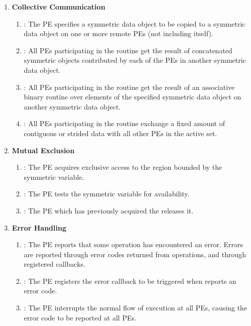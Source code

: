 \begin{enumerate}
\item \textbf{Collective Communication}
\begin{enumerate}
  \item {}: The  \ac{PE} specifies a symmetric data
      object to be copied to a symmetric data object on one or more remote
      \acp{PE} (not including itself). 
  \item {}: All \acp{PE} participating in the routine get the result
      of concatenated symmetric objects contributed by each of the \acp{PE} in
      another symmetric data object.
  \item {}: All \acp{PE} participating in the routine get the result
      of an associative binary routine over elements of the specified symmetric
      data object on another symmetric data object.
  \item {}: All \acp{PE} participating in the routine exchange
      a fixed amount of contiguous or strided data with all other \acp{PE}
      in the active set.
\end{enumerate}

\item \textbf{Mutual Exclusion}
\begin{enumerate}
  \item {}: The \ac{PE} acquires exclusive access to the region
      bounded by the symmetric  variable.
  \item {}: The \ac{PE} tests the symmetric  variable
      for availability.
  \item {}: The \ac{PE} which has previously acquired the
       releases it.
\end{enumerate}

\item \textbf{Error Handling}
\begin{enumerate}
  \item {}: The \ac{PE} reports that some operation has encountered 
      an error. Errors are reported through error codes returned from \openshmem 
      operations, and through registered callbacks.
  \item {}: The \ac{PE} registers the error callback to be triggered
      when \openshmem reports an error code.
  \item {}: The \ac{PE} interrupts the normal flow of execution at all 
      \acp{PE}, causing the error code to be reported at all \acp{PE}.
\end{enumerate}


\end{enumerate}
